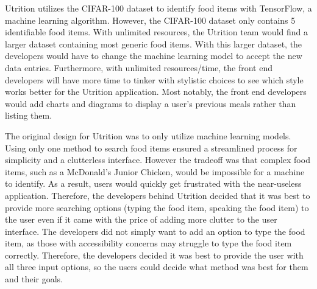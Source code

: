 \documentclass[12pt, titlepage]{article}
\begin{document}
Utrition utilizes the CIFAR-100 dataset to identify food items with TensorFlow, a machine learning algorithm. However, the CIFAR-100 dataset only contains 5 identifiable food items. With unlimited resources, the Utrition team would find a larger dataset containing most generic food items. With this larger dataset, the developers would have to change the machine learning model to accept the new data entries. Furthermore, with unlimited resources/time, the front end developers will have more time to tinker with stylistic choices to see which style works better for the Utrition application. Most notably, the front end developers would add charts and diagrams to display a user's previous meals rather than listing them.

The original design for Utrition was to only utilize machine learning models. Using only one method to search food items ensured a streamlined process for simplicity and a clutterless interface. However the tradeoff was that complex food items, such as a McDonald's Junior Chicken, would be impossible for a machine to identify. As a result, users would quickly get frustrated with the near-useless application. Therefore, the developers behind Utrition decided that it was best to provide more searching options (typing the food item, speaking the food item) to the user even if it came with the price of adding more clutter to the user interface. The developers did not simply want to add an option to type the food item, as those with accessibility concerns may struggle to type the food item correctly. Therefore, the developers decided it was best to provide the user with all three input options, so the users could decide what method was best for them and their goals.
\end{document}
